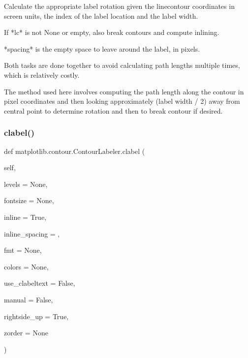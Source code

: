 \begin{DoxyVerb}Calculate the appropriate label rotation given the linecontour
coordinates in screen units, the index of the label location and the
label width.

If *lc* is not None or empty, also break contours and compute
inlining.

*spacing* is the empty space to leave around the label, in pixels.

Both tasks are done together to avoid calculating path lengths
multiple times, which is relatively costly.

The method used here involves computing the path length along the
contour in pixel coordinates and then looking approximately (label
width / 2) away from central point to determine rotation and then to
break contour if desired.
\end{DoxyVerb}
 \mbox{\label{classmatplotlib_1_1contour_1_1ContourLabeler_a0070dd0497a08bbc4e29a43ace021ae6}} 
\subsubsection{\texorpdfstring{clabel()}{clabel()}}
{\footnotesize\ttfamily def matplotlib.\+contour.\+Contour\+Labeler.\+clabel (\begin{DoxyParamCaption}\item[{}]{self,  }\item[{}]{levels = {\ttfamily None},  }\item[{}]{fontsize = {\ttfamily None},  }\item[{}]{inline = {\ttfamily True},  }\item[{}]{inline\+\_\+spacing = {},  }\item[{}]{fmt = {\ttfamily None},  }\item[{}]{colors = {\ttfamily None},  }\item[{}]{use\+\_\+clabeltext = {\ttfamily False},  }\item[{}]{manual = {\ttfamily False},  }\item[{}]{rightside\+\_\+up = {\ttfamily True},  }\item[{}]{zorder = {\ttfamily None} }\end{DoxyParamCaption})}

